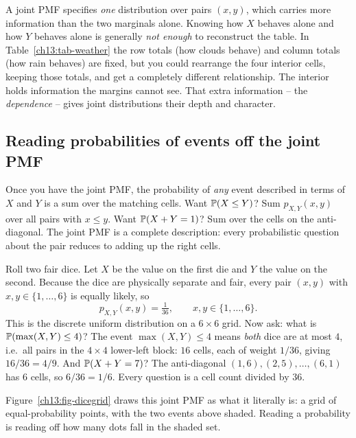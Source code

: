 \begin{happeningbox}
A joint PMF specifies \emph{one}
distribution over pairs $(x,y)$, which carries more information than the two marginals alone. Knowing how $X$ behaves alone
and how $Y$ behaves alone is generally \emph{not enough} to reconstruct the
table. In Table~\ref{ch13:tab-weather} the row totals (how clouds behave) and
column totals (how rain behaves) are fixed, but you could rearrange the four
interior cells, keeping those totals, and get a completely different
relationship. The interior holds information the margins cannot see. That extra
information -- the \emph{dependence} -- gives joint distributions their
depth and character.
\end{happeningbox}

\subsection{Reading probabilities of events off the joint PMF}

Once you have the joint PMF, the probability of \emph{any} event described in
terms of $X$ and $Y$ is a sum over the matching cells. Want
$\P(X \le Y)$? Sum $p_{X,Y}(x,y)$ over all pairs with $x\le y$. Want
$\P(X+Y = 1)$? Sum over the cells on the anti-diagonal. The joint PMF is a
complete description: every probabilistic question about the pair reduces to
adding up the right cells.

\begin{example}
\label{ch13:ex-twodice}
Roll two fair dice. Let $X$ be the value on the first die and $Y$ the value on
the second. Because the dice are physically separate and fair, every pair
$(x,y)$ with $x,y\in\{1,\dots,6\}$ is equally likely, so
\[
  p_{X,Y}(x,y) = \tfrac{1}{36}, \qquad x,y \in \{1,\dots,6\}.
\]
This is the discrete uniform distribution on a $6\times 6$ grid. Now ask: what is
$\P(\max(X,Y) \le 4)$? The event $\max(X,Y)\le 4$ means \emph{both} dice are at
most $4$, i.e.\ all pairs in the $4\times4$ lower-left block: $16$ cells, each of
weight $1/36$, giving $16/36 = 4/9$. And $\P(X+Y=7)$? The anti-diagonal
$(1,6),(2,5),\dots,(6,1)$ has $6$ cells, so $6/36 = 1/6$. Every question is a
cell count divided by $36$.
\end{example}

Figure~\ref{ch13:fig-dicegrid} draws this joint PMF as what it literally is: a
grid of equal-probability points, with the two events above shaded. Reading a
probability is reading off how many dots fall in the shaded set.

